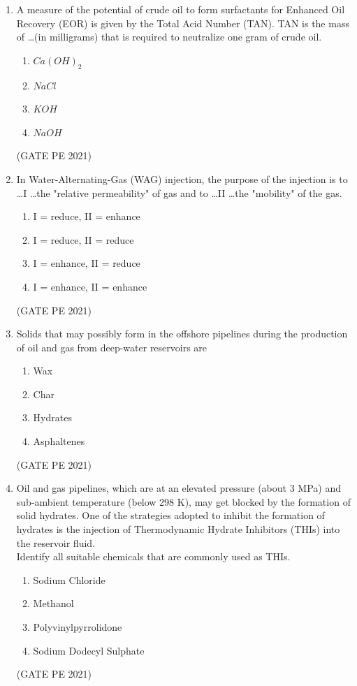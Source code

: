 \documentclass[journal,12pt,onecolumn]{IEEEtran}
\theoremstyle{remark}
\begin{document}
\begin{enumerate}
\item A measure of the potential of crude oil to form surfactants for Enhanced Oil Recovery (EOR) is given by the Total Acid Number (TAN). TAN is the mass of \dots (in milligrams) that is required to neutralize one gram of crude oil.
\begin{enumerate}
    \item $Ca(OH)_2$
    \item $NaCl$
    \item $KOH$
    \item $NaOH$
\end{enumerate}
\hfill{(GATE PE 2021)}

\item In Water-Alternating-Gas (WAG) injection, the purpose of the injection is to \dots I \dots the "relative permeability" of gas and to \dots II \dots the "mobility" of the gas.
\begin{enumerate}
    \item I = reduce, II = enhance
    \item I = reduce, II = reduce
    \item I = enhance, II = reduce
    \item I = enhance, II = enhance
\end{enumerate}
\hfill{(GATE PE 2021)}

\item Solids that may possibly form in the offshore pipelines during the production of oil and gas from deep-water reservoirs are
\begin{enumerate}
    \item Wax
    \item Char
    \item Hydrates
    \item Asphaltenes
\end{enumerate}
\hfill{(GATE PE 2021)}

\item Oil and gas pipelines, which are at an elevated pressure (about 3 MPa) and sub-ambient temperature (below 298 K), may get blocked by the formation of solid hydrates. One of the strategies adopted to inhibit the formation of hydrates is the injection of Thermodynamic Hydrate Inhibitors (THIs) into the reservoir fluid.\\
Identify all suitable chemicals that are commonly used as THIs.
\begin{enumerate}
    \item Sodium Chloride
    \item Methanol
    \item Polyvinylpyrrolidone
    \item Sodium Dodecyl Sulphate
\end{enumerate}
\hfill{(GATE PE 2021)}


\end{enumerate}
\end{document}
